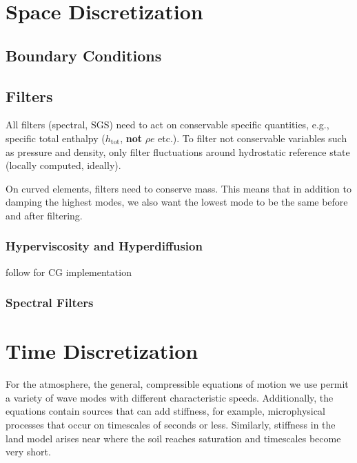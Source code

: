 \documentclass{report}
\begin{document}

\chapter{Space Discretization}

\section{Boundary Conditions}

\section{Filters}

All filters (spectral, SGS) need to act on conservable specific quantities, e.g., specific total enthalpy ($h_\mathrm{tot}$, \textbf{not} $\rho e$ etc.). To filter not conservable variables such as pressure and density, only filter fluctuations around hydrostatic reference state (locally computed, ideally).

On curved elements, filters need to conserve mass. This means that in addition to damping the highest modes, we also want the lowest mode to be the same before and after filtering.

\subsection{Hyperviscosity and Hyperdiffusion}

follow \citet{Dennis12a} for CG implementation

\subsection{Spectral Filters}

\chapter{Time Discretization}\label{s:timestepping}

For the atmosphere, the general, compressible equations of motion we use permit a variety of wave modes with different characteristic speeds. Additionally, the equations contain sources that can add stiffness, for example, microphysical processes that occur on timescales of seconds or less. Similarly, stiffness in the land model arises near where the soil reaches saturation and timescales become very short.
\end{document}
